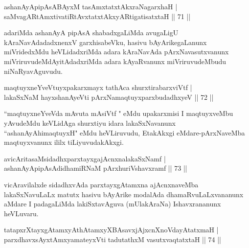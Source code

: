 \begin{shl}
ashanAyApipAsABAyxM tasAmxtatxtAkxraNagarxhaH |\\
\footnotemark[1]saMvagARtAmxtivatiRtAvxtatxtAkxyARtigatisatxtaH \hfill || 71 ||
\end{shl}

\begin{artha}
adariMda ashanAyA pipAsA shabadxgaLiMda avugaLigU kAraNavAdadadxnenxV garxhisabeVku, hasivu bAyArikegaLanunx miVridedxMdu heVLidadxriMda adara kAraNavAda pArxNavasutxvanunx miVriruvudeMdAyitAdadxriMda adara kAyaRvanunx miVriruvudeMbudu niNaRyavAguvudu.
\end{artha}


\begin{shl}
maqtuyxneYveVtuyxpakarxmayx tathAca shurxtirabarxviVtf |\\
lakaSxNaM hayxshanAyeVti pArxNamaqtuyxparxbudadhxyeV \hfill || 72 ||
\end{shl}

\begin{artha}
``maqtuyxneYveVda mAvuta mAsiVtf " eMdu upakarxmisi I maqtuyxveMbu yAvudeMdu keVLidAga shurxtiyu idara lakaSxNavanunx ``ashanAyAhimaqtuyxH" eMdu heVLiruvudu, EtakAkxgi eMdare-pArxNaveMba maqtuyxvanunx ililx tiLiyuvudakAkxgi.
\end{artha}


\begin{shl}
avicAritasaMsidadhxparxtayxgajAcnxnalakaSxNamf |\\
ashanAyApipAsAdidhamiRNaM pArxhuriVshavxramf \hfill || 73 ||
\end{shl}

\begin{artha}
vicAravilalxde sidadhxvAda parxtayxgAtamxna ajAcnxnaveMba lakaSxNavuLaLx matutx hasivu bAyArike modalAda dhamaRvuLaLxvananunx aMdare I padagaLiMda lakiSxtavAguva (mUlakAraNa) Ishavxrananunx heVLuvaru.
\end{artha}

\begin{shl}
tatapxrXtayxgAtamxyAthAtamxyXBAsavxjAjxcnXnoVdayAtatxmaH |\\
parxdhavxsAyx\s \s tAmx\s yamateyxVti tadutathxM vasutxvaqtatxtaH \hfill || 74 ||
\end{shl}


